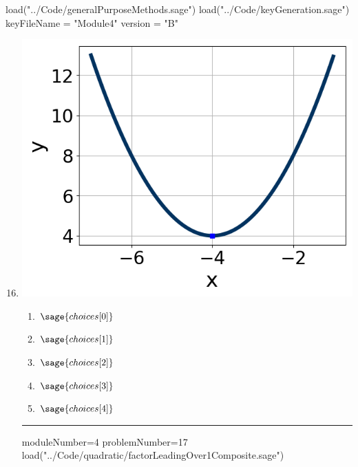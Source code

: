 \documentclass[14pt]{article}
\newcommand{\litem}[1]{\item#1\hspace*{-1cm}\rule{\textwidth}{0.4pt}}
\begin{document}
\pagestyle{fancy}

\begin{sagesilent}
load("../Code/generalPurposeMethods.sage")
load("../Code/keyGeneration.sage")
keyFileName = "Module4"
version = "B"
\end{sagesilent}

\begin{enumerate}
\setcounter{enumi}{15}


\begin{sagesilent}
moduleNumber=4
problemNumber=16
load("../Code/quadratic/quadraticGraphToEquation.sage")
\end{sagesilent}

\litem{ 

	\begin{center} \includegraphics[scale=0.3]{../Figures/quadraticGraphToEquationB.png} \end{center}

	\begin{enumerate}[label=\Alph*.]
		\item \( \sage{choices[0]} \)
		\item \( \sage{choices[1]} \)
		\item \( \sage{choices[2]} \)
		\item \( \sage{choices[3]} \)
		\item \( \sage{choices[4]} \)
	\end{enumerate}

}

\begin{sagesilent}
moduleNumber=4
problemNumber=17
load("../Code/quadratic/factorLeadingOver1Composite.sage")
\end{sagesilent}


\end{enumerate}
\end{document}
